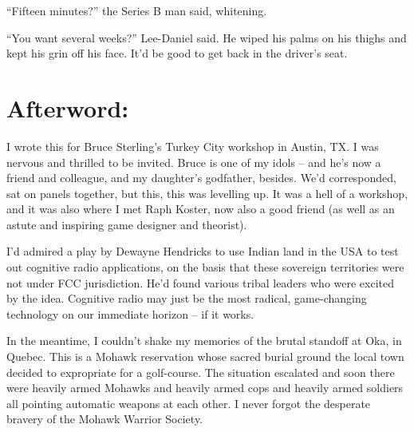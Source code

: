 “Fifteen minutes?” the Series B man said, whitening.

“You want several weeks?” Lee-Daniel said. He wiped his palms on 
his thighs and kept his grin off his face. It'd be good to get back in 
the driver's seat.

\section{Afterword:}

I wrote this for Bruce Sterling's Turkey City workshop in Austin, TX. I 
was nervous and thrilled to be invited. Bruce is one of my idols -- and 
he's now a friend and colleague, and my daughter's godfather, besides. 
We'd corresponded, sat on panels together, but this, this was levelling 
up. It was a hell of a workshop, and it was also where I met Raph 
Koster, now also a good friend (as well as an astute and inspiring game 
designer and theorist).

I'd admired a play by Dewayne Hendricks to use Indian land in the USA 
to test out cognitive radio applications, on the basis that these 
sovereign territories were not under FCC jurisdiction. He'd found 
various tribal leaders who were excited by the idea. Cognitive radio 
may just be the most radical, game-changing technology on our immediate 
horizon -- if it works.

In the meantime, I couldn't shake my memories of the brutal standoff at 
Oka, in Quebec. This is a Mohawk reservation whose sacred burial ground 
the local town decided to expropriate for a golf-course. The situation 
escalated and soon there were heavily armed Mohawks and heavily armed 
cops and heavily armed soldiers all pointing automatic weapons at each 
other. I never forgot the desperate bravery of the Mohawk Warrior 
Society.

